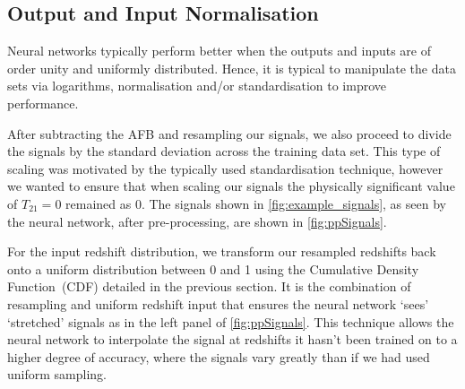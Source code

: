 \subsection{Output and Input Normalisation}

Neural networks typically perform better when the outputs and inputs are of order unity and uniformly distributed. Hence, it is typical to manipulate the data sets via logarithms, normalisation and/or standardisation to improve performance.

After subtracting the AFB and resampling our signals, we also proceed to divide the signals by the standard deviation across the training data set. This type of scaling was motivated by the typically used standardisation technique, however we wanted to ensure that when scaling our signals the physically significant value of $T_{21} = 0$ remained as 0.%
The signals shown in \cref{fig:example_signals}, as seen by the neural network, after pre-processing, are shown in \cref{fig:ppSignals}. 

For the input redshift distribution, we transform our resampled redshifts back onto a uniform distribution between 0 and 1 using the Cumulative Density Function~(CDF) detailed in the previous section. It is the combination of resampling and uniform redshift input that ensures the neural network `sees' `stretched' signals as in the left panel of \cref{fig:ppSignals}. This technique allows the neural network to interpolate the signal at redshifts it hasn't been trained on to a higher degree of accuracy, where the signals vary greatly than if we had used uniform sampling.

